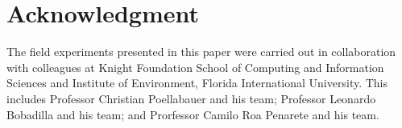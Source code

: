\section{Acknowledgment}
The field experiments presented in this paper were carried out in collaboration with colleagues at Knight Foundation School of Computing and Information Sciences and Institute of Environment, Florida International University. This includes Professor Christian Poellabauer and his team; Professor Leonardo Bobadilla and his team; and Prorfessor Camilo Roa Penarete and his team.